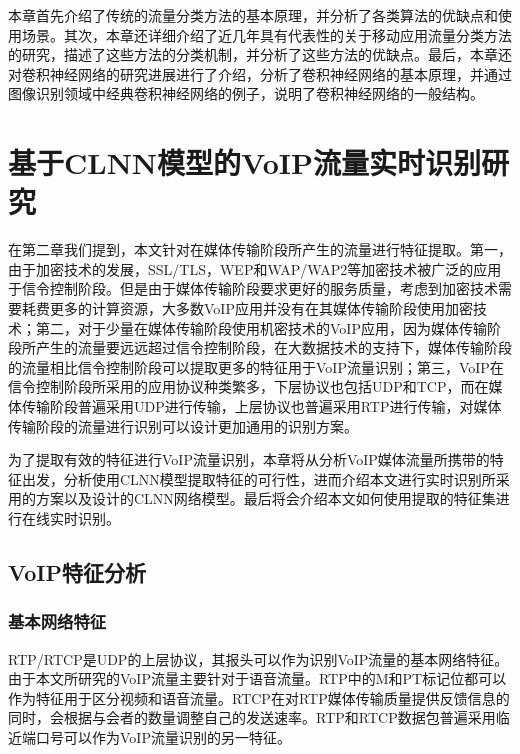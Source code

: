 本章首先介绍了传统的流量分类方法的基本原理，并分析了各类算法的优缺点和使用场景。其次，本章还详细介绍了近几年具有代表性的关于移动应用流量分类方法的研究，描述了这些方法的分类机制，并分析了这些方法的优缺点。最后，本章还对卷积神经网络的研究进展进行了介绍，分析了卷积神经网络的基本原理，并通过图像识别领域中经典卷积神经网络的例子，说明了卷积神经网络的一般结构。












\chapter{基于CLNN模型的VoIP流量实时识别研究}
在第二章我们提到，本文针对在媒体传输阶段所产生的流量进行特征提取。第一，由于加密技术的发展，SSL/TLS，WEP和WAP/WAP2等加密技术被广泛的应用于信令控制阶段。但是由于媒体传输阶段要求更好的服务质量，考虑到加密技术需要耗费更多的计算资源，大多数VoIP应用并没有在其媒体传输阶段使用加密技术；第二，对于少量在媒体传输阶段使用机密技术的VoIP应用，因为媒体传输阶段所产生的流量要远远超过信令控制阶段，在大数据技术的支持下，媒体传输阶段的流量相比信令控制阶段可以提取更多的特征用于VoIP流量识别；第三，VoIP在信令控制阶段所采用的应用协议种类繁多，下层协议也包括UDP和TCP，而在媒体传输阶段普遍采用UDP进行传输，上层协议也普遍采用RTP进行传输，对媒体传输阶段的流量进行识别可以设计更加通用的识别方案。


为了提取有效的特征进行VoIP流量识别，本章将从分析VoIP媒体流量所携带的特征出发，分析使用CLNN模型提取特征的可行性，进而介绍本文进行实时识别所采用的方案以及设计的CLNN网络模型。最后将会介绍本文如何使用提取的特征集进行在线实时识别。
\section{VoIP特征分析}

\subsection{基本网络特征}
RTP/RTCP是UDP的上层协议，其报头可以作为识别VoIP流量的基本网络特征。由于本文所研究的VoIP流量主要针对于语音流量。RTP中的M和PT标记位都可以作为特征用于区分视频和语音流量。RTCP在对RTP媒体传输质量提供反馈信息的同时，会根据与会者的数量调整自己的发送速率。RTP和RTCP数据包普遍采用临近端口号可以作为VoIP流量识别的另一特征。

